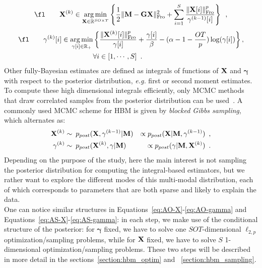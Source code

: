 \begin{equation}\label{eq:AO-X}
\fl \qquad  \bfX^{(k)} \in \argmin_{\bfX\in\R^{SO \times T}} \left\lbrace \frac{1}{2} \fronormsq{\bfM - \bfG \bfX} + \sum_{i=1}^S  \frac{\fronorm{\bfX[i]}^p}{\mathbf{\gamma}^{(k-1)}[i]} \right\rbrace \enspace,
\end{equation}
\begin{equation}\label{eq:AO-gamma}
\begin{split}
\fl \qquad \mathbf{\gamma}^{(k)}[i] \in \argmin_{\mathbf{\gamma}[i]\in \R_+} & \left\lbrace\frac{\fronorm{\bfX^{(k)}[i]}^p }{\mathbf{\gamma}[i]} + \frac{\mathbf{\gamma}[i]}{\beta} - (\alpha - 1 - \frac{OT}{p}) \log(\mathbf{\gamma}[i]) \right\rbrace, \\
& \forall i\in [1,\cdots, S] \enspace. 
\end{split}
\end{equation}
Other fully-Bayesian estimates are defined as integrals of functions of $\mathbf{X}$ and $\mathbf{\gamma}$ with respect to the posterior distribution, \textit{e.g.} first or second moment estimates. To compute these high dimensional integrals efficiently, only \ac{MCMC} methods that draw correlated samples from the posterior distribution can be used~\cite{RoCa05,KaSo05}. A commonly used MCMC scheme for HBM is given by \emph{blocked Gibbs sampling}, which alternates as:
\begin{eqnarray}
\mathbf{X}^{(k)} &\sim \: p_{post}(\mathbf{X},\mathbf{\gamma}^{(k-1)}|\mathbf{M}) &\propto p_{post}(\mathbf{X}|\mathbf{M},\mathbf{\gamma}^{(k-1)}) \enspace, \label{eq:AS-X}\\
\mathbf{\gamma}^{(k)} &\sim \: p_{post}(\mathbf{X}^{(k)},\mathbf{\gamma}|\mathbf{M}) &\propto p_{post}(\mathbf{\gamma}|\mathbf{M},\mathbf{X}^{(k)})\enspace. \label{eq:AS-gamma}
\end{eqnarray}
Depending on the purpose of the study, here the main interest is not sampling the posterior distribution for computing the integral-based estimators, but we rather want to explore the different modes of this multi-modal distribution, each of which corresponds to parameters that are both sparse and likely to explain the data.\\
One can notice similar structures in Equations~\eqref{eq:AO-X}-\eqref{eq:AO-gamma} and Equations~\eqref{eq:AS-X}-\eqref{eq:AS-gamma}: in each step, we make use of the conditional structure of the posterior: for $\mathbf{\gamma}$ fixed, we have to solve one $SOT$-dimensional $\ell_{2,p}$ optimization/sampling problems, while for $\mathbf{X}$ fixed, we have to solve $S$ 1-dimensional optimization/sampling problems. These two steps will be described in more detail in the sections~\ref{section:hbm_optim} and~ \ref{section:hbm_sampling}.

